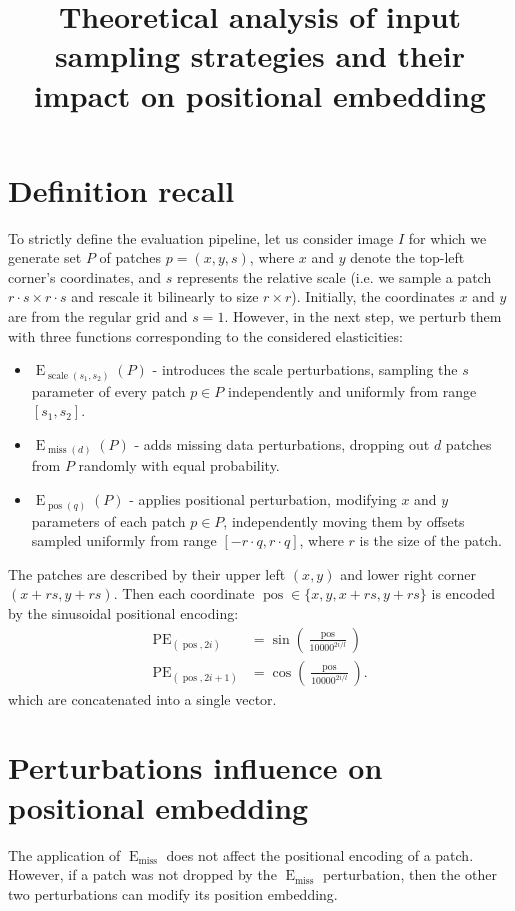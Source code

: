 \documentclass{article}
\title{Theoretical analysis of input sampling strategies and their impact on positional embedding}
\DeclareMathOperator{\E}{E}
\DeclareMathOperator{\miss}{miss}
\DeclareMathOperator{\scale}{scale}
\DeclareMathOperator{\pos}{pos}
\DeclareMathOperator{\PE}{PE}
\begin{document}

\section*{Definition recall}
To strictly define the evaluation pipeline, let us consider image $I$ for which we generate set $P$ of patches $p = (x, y, s)$, where $x$ and $y$ denote the top-left corner's coordinates, and $s$ represents the relative scale (i.e. we sample a patch $r \cdot s \times r \cdot s$ and rescale it bilinearly to size $r \times r$). Initially, the coordinates $x$ and $y$ are from the regular grid and $s=1$. However, in the next step, we perturb them with three functions corresponding to the considered elasticities:
\begin{itemize}
\item $\E_{\scale(s_1, s_2)}(P)$ - introduces the scale perturbations,  sampling the $s$ parameter of every patch $p \in P$ independently and uniformly from range $[s_1, s_2]$.
\item $\E_{\miss(d)}(P)$ - adds missing data perturbations, dropping out $d$ patches from $P$ randomly with equal probability. 
\item $\E_{\pos(q)}(P)$ - applies positional perturbation, modifying $x$ and $y$ parameters of each patch $p \in P$, independently moving them by offsets sampled uniformly from range $[-r \cdot q, r \cdot q]$, where $r$ is the size of the patch.
\end{itemize}

The patches are described by their upper left $(x, y)$ and lower right corner $(x + rs, y+rs)$. Then each coordinate $\pos \in \{x, y, x+rs, y+rs\}$ is encoded by the sinusoidal positional encoding:
\begin{align*}
    \PE_{(\pos,2i)} &= \sin\left(\frac{\pos}{10000^{2i/l}}\right) \\
    \PE_{(\pos,2i+1)} &= \cos\left(\frac{\pos}{10000^{2i/l}}\right).
\end{align*}
which are concatenated into a single vector.

\section*{Perturbations influence on positional embedding}

The application of $\E_{\miss}$ does not affect the positional encoding of a patch. However, if a patch was not dropped by the $\E_{\miss}$ perturbation, then the other two perturbations can modify its position embedding.
\end{document}
